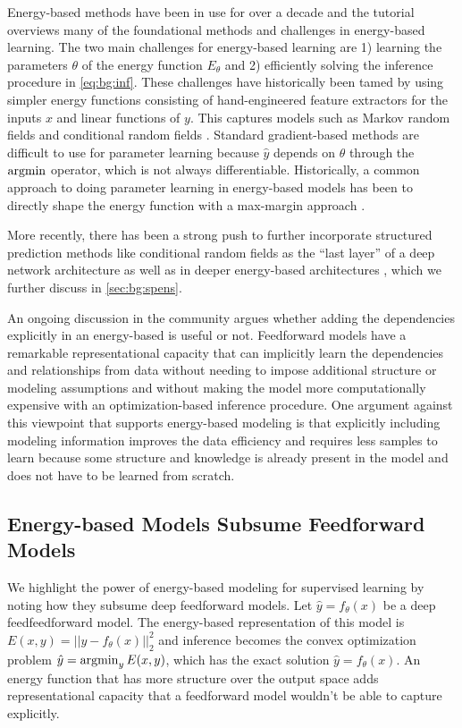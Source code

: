 Energy-based methods have been in use for over a decade
and the tutorial \citet{lecun2006tutorial} overviews
many of the foundational methods and challenges
in energy-based learning.
The two main challenges for energy-based learning are
1) learning the parameters $\theta$ of the energy
function $E_\theta$ and 2) efficiently solving
the inference procedure in \cref{eq:bg:inf}.
These challenges have historically been tamed by
using simpler energy functions consisting of
hand-engineered feature extractors for the inputs
$x$ and linear functions of $y$.
This captures models such as Markov random fields
\citep{li1994markov}
and conditional random fields
\citep{lafferty2001conditional,sutton2012introduction}.
Standard gradient-based methods are difficult to use
for parameter learning because $\hat y$ depends on $\theta$
through the $\operatorname*{argmin}$ operator, which is not always differentiable.
Historically, a common approach to doing parameter learning
in energy-based models has been to directly shape the
energy function with a max-margin approach
\citet{taskar2004max,taskar2005learning}.

More recently, there has been a strong push to further incorporate
structured prediction methods like conditional random fields as the
``last layer'' of a deep network architecture
\citep{peng2009conditional,zheng2015conditional,chen2015learning}
as well as in deeper energy-based architectures
\citep{belanger2016structured,belanger2017end,belanger2017deep},
which we further discuss in \cref{sec:bg:spens}.

An ongoing discussion in the community argues whether
adding the dependencies explicitly in an energy-based is useful or not.
Feedforward models have a remarkable representational
capacity that can implicitly learn the dependencies and
relationships from data without needing to impose
additional structure or modeling assumptions and
without making the model more computationally
expensive with an optimization-based inference procedure.
One argument against this viewpoint that supports
energy-based modeling is that explicitly including
modeling information improves the data efficiency
and requires less samples to learn because some
structure and knowledge is already present in the model
and does not have to be learned from scratch.

\subsection{Energy-based Models Subsume Feedforward Models}
\label{sec:bg:ff-energy}
We highlight the power of energy-based modeling for supervised
learning by noting how they subsume deep feedforward models.
Let $\hat y = f_\theta(x)$ be a deep feedfeedforward model.
The energy-based representation of this model is
$E(x,y) = ||y-f_\theta(x)||_2^2$
and inference becomes the convex optimization problem
$\hat y = \operatorname*{argmin}_y E(x,y)$, which
has the exact solution $\hat y = f_\theta(x)$.
An energy function that has more structure over the output
space adds representational capacity that a feedforward
model wouldn't be able to capture explicitly.

